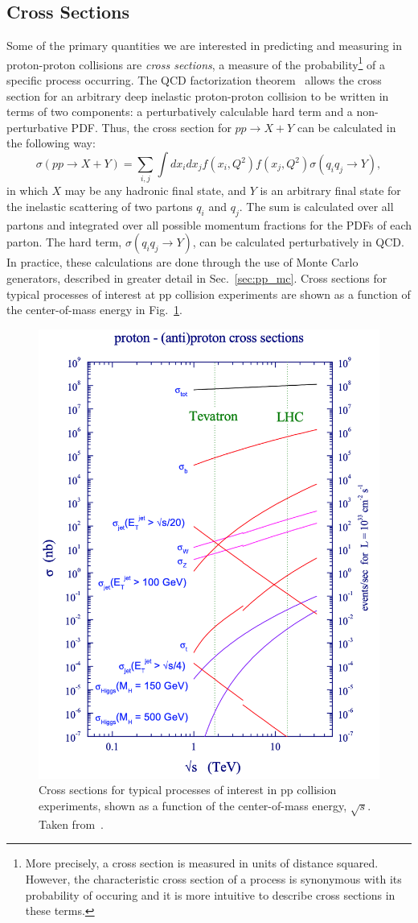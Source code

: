 \subsection{Cross Sections}
Some of the primary quantities we are interested in predicting and measuring in proton-proton collisions are \emph{cross sections}, a measure of the probability\footnote{More precisely, a cross section is measured in units of distance squared. However, the characteristic cross section of a process is synonymous with its probability of occuring and it is more intuitive to describe cross sections in these terms.} of a specific process occurring.
The QCD factorization theorem~\cite{Collins:1989gx} allows the cross section for an arbitrary deep inelastic proton-proton collision to be written in terms of two components: a perturbatively calculable hard term and a non-perturbative PDF.
Thus, the cross section for $pp \to X + Y$ can be calculated in the following way:
\begin{equation} 
    \sigma(pp \to X + Y) = \sum_{i,j} \int dx_i dx_j f(x_i, Q^2) f(x_j, Q^2) \sigma(q_i q_j \to Y),
\end{equation}
in which $X$ may be any hadronic final state, and $Y$ is an arbitrary final state for the inelastic scattering of two partons $q_i$ and $q_j$.
The sum is calculated over all partons and integrated over all possible momentum fractions for the PDFs of each parton.
The hard term, $\sigma(q_i q_j \to Y)$, can be calculated perturbatively in QCD.
In practice, these calculations are done through the use of Monte Carlo generators, described in greater detail in Sec.~\ref{sec:pp_mc}.
Cross sections for typical processes of interest at pp collision experiments are shown as a function of the center-of-mass energy in Fig.~\ref{fig:pp_xs}.
\begin{figure}[htbp!]
    \centering
    \includegraphics[width=0.6\linewidth]{figures/physics_of_pp/pp_cross_sections.png}
    \caption{Cross sections for typical processes of interest in pp collision experiments, shown as a function of the center-of-mass energy, $\sqrt{s}$. Taken from~\cite{Campbell:2006wx}.}
    \label{fig:pp_xs}
\end{figure}

